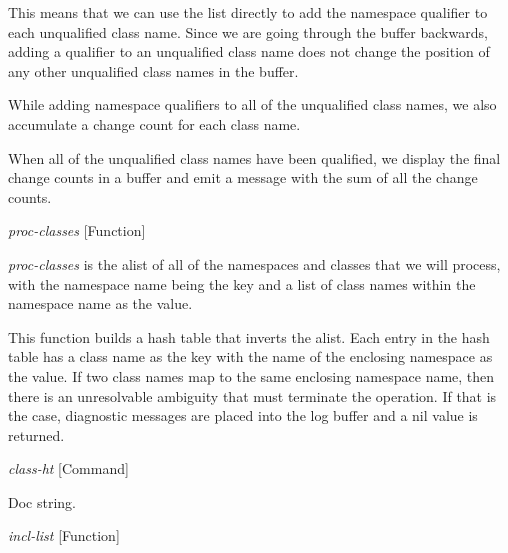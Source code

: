 \begin{doc-string}
This means that we can use the list directly to add the namespace qualifier to
each unqualified class name.  Since we are going through the buffer backwards,
adding a qualifier to an unqualified class name does not change the position of
any other unqualified class names in the buffer.

While adding namespace qualifiers to all of the unqualified class names, we also
accumulate a change count for each class name.

When all of the unqualified class names have been qualified, we display the
final change counts in a buffer and emit a message with the sum of all the
change counts.
\end{doc-string}

\vspace{1em}
\noindent
{}
\usebox{\funcname}\emph{proc-classes}
 \hfill [Function]
\hspace*{\wd\funcname}

\begin{doc-string}
\emph{proc-classes} is the alist of all of the namespaces and classes that we will
process, with the namespace name being the key and a list of class names within the
namespace name as the value.

This function builds a hash table that inverts the
alist.  Each entry in the hash table has a class name as the key with the name
of the enclosing namespace as the value.
If two class names map to the same enclosing namespace name, then there is an
unresolvable ambiguity that must terminate the operation.  If that is the case,
diagnostic messages are placed into the log buffer and a nil value is returned.
\end{doc-string}

\vspace{1em}
\noindent
{}
\usebox{\funcname}\emph{class-ht}
 \hfill [Command]

\begin{doc-string}
Doc string.
\end{doc-string}

\vspace{1em}
\noindent
{}
\usebox{\funcname}\emph{incl-list}
 \hfill [Function]
\hspace*{\wd\funcname}


